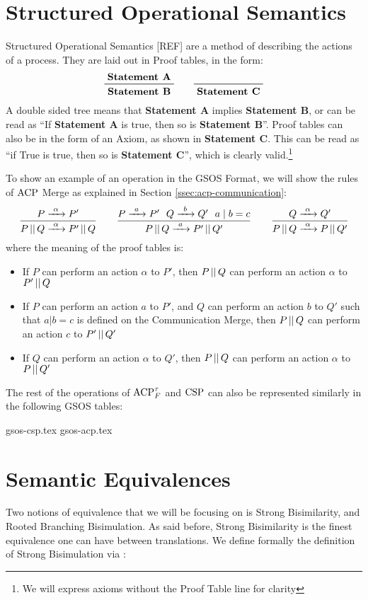 \documentclass[../hons_project.tex]{subfiles}
\begin{document}
\section{Structured Operational Semantics}
Structured Operational Semantics [REF] are a method of describing the actions of a process. They are laid out in Proof tables, in the form:
\[\prftree{\text{\textbf{Statement A}}}{\text{\textbf{Statement B}}} \qquad \prftree{}{\text{\textbf{Statement C}}}\]
A double sided tree means that \textbf{Statement A} implies \textbf{Statement B}, or can be read as ``If \textbf{Statement A} is true, then so is \textbf{Statement B}''. Proof tables can also be in the form of an Axiom, as shown in \textbf{Statement C}. This can be read as ``if True is true, then so is \textbf{Statement C}'', which is clearly valid.\footnote{We will express axioms without the Proof Table line for clarity}

To show an example of an operation in the GSOS Format, we will show the rules of $\acp$ Merge as explained in Section \ref{ssec:acp-communication}:
\[
\displaystyle\frac{P\prightarrow{\alpha} P'}{P \merge Q \prightarrow{\alpha} P' \merge Q} \qquad 
\displaystyle\frac{P\prightarrow{a} P'~~Q\prightarrow{b} Q'~~ a \mid b = c}{P \merge Q \prightarrow{a} P' \merge Q'} \qquad 
\displaystyle\frac{Q\prightarrow{\alpha} Q'}{P \merge Q \prightarrow{\alpha} P \merge Q'}
\]
where the meaning of the proof tables is:
\begin{itemize}
    \item If $P$ can perform an action $\alpha$ to $P'$, then $P \merge Q$ can perform an action $\alpha$ to $P' \merge Q$
    \item If $P$ can perform an action $a$ to $P'$, and $Q$ can perform an action $b$ to $Q'$ such that $a | b = c$ is defined on the Communication Merge, then $P \merge Q$ can perform an action $c$ to $P' \merge Q'$
    \item If $Q$ can perform an action $\alpha$ to $Q'$, then $P \merge Q$ can perform an action $\alpha$ to $P \merge Q'$
\end{itemize}

The rest of the operations of $\acptf$ and $\csp$ can also be represented similarly in the following GSOS tables:

{gsos-csp.tex}
{gsos-acp.tex}

\section{Semantic Equivalences}
Two notions of equivalence that we will be focusing on is Strong Bisimilarity, and Rooted Branching Bisimulation. As said before, Strong Bisimilarity is the finest equivalence one can have between translations. We define formally the definition of Strong Bisimulation via \cite{baetenProcessAlgebra1990}:
\end{document}
